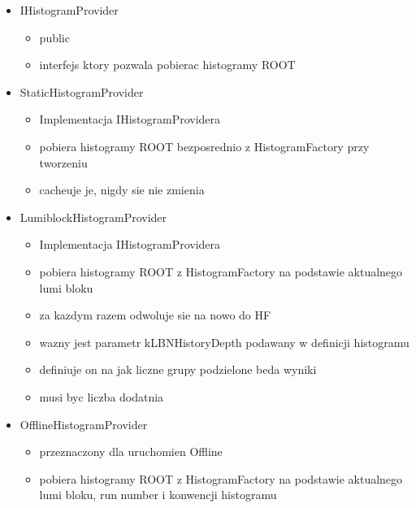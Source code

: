 \begin{itemize}
\item IHistogramProvider
	\begin{itemize}
	\item public
	\item interfejs ktory pozwala pobierac histogramy ROOT 
	\end{itemize}
\item StaticHistogramProvider
	\begin{itemize}
	\item Implementacja IHistogramProvidera
	\item pobiera histogramy ROOT bezposrednio z HistogramFactory przy tworzeniu
	\item cacheuje je, nigdy sie nie zmienia
	\end{itemize}
\item LumiblockHistogramProvider
	\begin{itemize}
	\item Implementacja IHistogramProvidera
	\item pobiera histogramy ROOT z HistogramFactory na podstawie aktualnego lumi bloku
	\item za kazdym razem odwoluje sie na nowo do HF
	\item wazny jest parametr kLBNHistoryDepth podawany w definicji histogramu
	\item definiuje on na jak liczne grupy podzielone beda wyniki
	\item musi byc liczba dodatnia
	\end{itemize}
\item OfflineHistogramProvider
	\begin{itemize}
	\item przeznaczony dla uruchomien Offline
	\item pobiera histogramy ROOT z HistogramFactory na podstawie aktualnego lumi bloku, run number i konwencji histogramu 
	\end{itemize}
	

\end{itemize}
